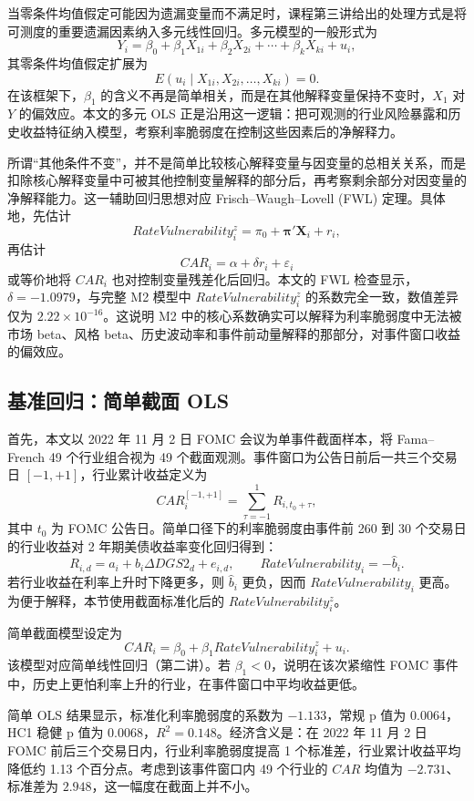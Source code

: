 \documentclass[UTF8,zihao=-4]{ctexart}
\begin{document}
当零条件均值假定可能因为遗漏变量而不满足时，课程第三讲给出的处理方式是将可测度的重要遗漏因素纳入多元线性回归。多元模型的一般形式为
\[
Y_i=\beta_0+\beta_1 X_{1i}+\beta_2 X_{2i}+\cdots+\beta_k X_{ki}+u_i,
\]
其零条件均值假定扩展为
\[
E(u_i\mid X_{1i},X_{2i},\ldots,X_{ki})=0.
\]
在该框架下，$\beta_1$ 的含义不再是简单相关，而是在其他解释变量保持不变时，$X_1$ 对 $Y$ 的偏效应。本文的多元 OLS 正是沿用这一逻辑：把可观测的行业风险暴露和历史收益特征纳入模型，考察利率脆弱度在控制这些因素后的净解释力。

所谓“其他条件不变”，并不是简单比较核心解释变量与因变量的总相关关系，而是扣除核心解释变量中可被其他控制变量解释的部分后，再考察剩余部分对因变量的净解释能力。这一辅助回归思想对应 Frisch--Waugh--Lovell (FWL) 定理。具体地，先估计
\[
RateVulnerability_i^z
=\pi_0+\boldsymbol{\pi}'\mathbf{X}_i+r_i,
\]
再估计
\[
CAR_i=\alpha+\delta r_i+\varepsilon_i
\]
或等价地将 $CAR_i$ 也对控制变量残差化后回归。本文的 FWL 检查显示，$\delta=-1.0979$，与完整 M2 模型中 $RateVulnerability_i^z$ 的系数完全一致，数值差异仅为 $2.22\times 10^{-16}$。这说明 M2 中的核心系数确实可以解释为利率脆弱度中无法被市场 beta、风格 beta、历史波动率和事件前动量解释的那部分，对事件窗口收益的偏效应。

\subsection{基准回归：简单截面 OLS}
\label{subsec:simple_ols}

首先，本文以 2022 年 11 月 2 日 FOMC 会议为单事件截面样本，将 Fama--French 49 个行业组合视为 49 个截面观测。事件窗口为公告日前后一共三个交易日 $[-1,+1]$，行业累计收益定义为
\[
CAR_i^{[-1,+1]}=\sum_{\tau=-1}^{1}R_{i,t_0+\tau},
\]
其中 $t_0$ 为 FOMC 公告日。简单口径下的利率脆弱度由事件前 260 到 30 个交易日的行业收益对 2 年期美债收益率变化回归得到：
\[
R_{i,d}=a_i+b_i\Delta DGS2_d+e_{i,d}, \qquad
RateVulnerability_i=-\widehat{b}_i.
\]
若行业收益在利率上升时下降更多，则 $\widehat{b}_i$ 更负，因而 $RateVulnerability_i$ 更高。为便于解释，本节使用截面标准化后的 $RateVulnerability_i^z$。

简单截面模型设定为
\[
CAR_i=\beta_0+\beta_1 RateVulnerability_i^z+u_i.
\]
该模型对应简单线性回归（第二讲）。若 $\beta_1<0$，说明在该次紧缩性 FOMC 事件中，历史上更怕利率上升的行业，在事件窗口中平均收益更低。

简单 OLS 结果显示，标准化利率脆弱度的系数为 $-1.133$，常规 p 值为 0.0064，HC1 稳健 p 值为 0.0068，$R^2=0.148$。经济含义是：在 2022 年 11 月 2 日 FOMC 前后三个交易日内，行业利率脆弱度提高 1 个标准差，行业累计收益平均降低约 1.13 个百分点。考虑到该事件窗口内 49 个行业的 $CAR$ 均值为 $-2.731$、标准差为 $2.948$，这一幅度在截面上并不小。
\end{document}
